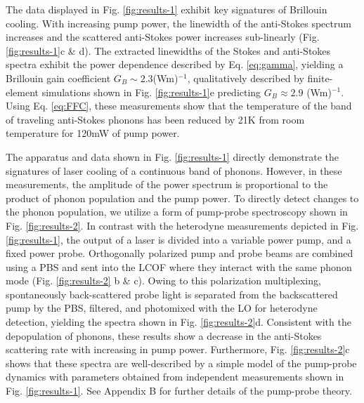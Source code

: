 The data displayed in Fig. \ref{fig:results-1} exhibit key signatures of Brillouin cooling. With increasing pump power, the linewidth of the anti-Stokes spectrum increases and the scattered anti-Stokes power increases sub-linearly (Fig. \ref{fig:results-1}c \& d). The extracted linewidths of the Stokes and anti-Stokes spectra exhibit the power dependence described by Eq. \eqref{eq:gamma}, yielding a Brillouin gain coefficient $G_B \sim 2.3$(Wm)$^{-1}$, qualitatively described by finite-element simulations shown in Fig. \ref{fig:results-1}e predicting $G_B \approx 2.9$ (Wm)$^{-1}$. %
Using Eq. \eqref{eq:FFC}, these measurements show that the temperature of the band of traveling anti-Stokes phonons has been reduced by 21K from room temperature for 120mW of pump power.

The apparatus and data shown in Fig. \ref{fig:results-1} directly demonstrate the signatures of laser cooling of a continuous band of phonons. However, in these measurements, the amplitude of the power spectrum is proportional to the product of phonon population and the pump power. To directly detect changes to the phonon population, we utilize a form of pump-probe spectroscopy shown in Fig. \ref{fig:results-2}. In contrast with the heterodyne measurements depicted in Fig. \ref{fig:results-1}, the output of a laser is divided into a variable power pump, and a fixed power probe. Orthogonally polarized pump and probe beams are combined using a \acf{PBS} and sent into the \ac{LCOF} where they interact with the same phonon mode (Fig. \ref{fig:results-2} b \& c). Owing to this polarization multiplexing, spontaneously back-scattered probe light is separated from the backscattered pump by the \ac{PBS}, filtered, and photomixed with the \ac{LO} for heterodyne detection, yielding the spectra shown in Fig. \ref{fig:results-2}d. Consistent with the depopulation of phonons, these results show a decrease in the anti-Stokes scattering rate with increasing in pump power. Furthermore, Fig. \ref{fig:results-2}c shows that these spectra are well-described by a simple model of the pump-probe dynamics with parameters obtained from independent measurements shown in Fig. \ref{fig:results-1}. See Appendix B for further details of the pump-probe theory.

